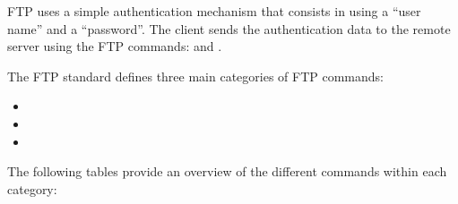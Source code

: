 \documentclass[a4paper,10pt,english,openany,oneside]{sphinxmanual}
\begin{document}
\sphinxAtStartPar
FTP uses a simple authentication mechanism that consists in using a “user name” and a “password”. The client sends the authentication data to the remote server using the FTP commands:  and .

\sphinxAtStartPar
The FTP standard defines three main categories of FTP commands:
\begin{itemize}
\item {} 
\sphinxAtStartPar
{}

\item {} 
\sphinxAtStartPar
{}

\item {} 
\sphinxAtStartPar
{}

\end{itemize}

\sphinxAtStartPar
The following tables provide an overview of the different commands within each category:
\end{document}
